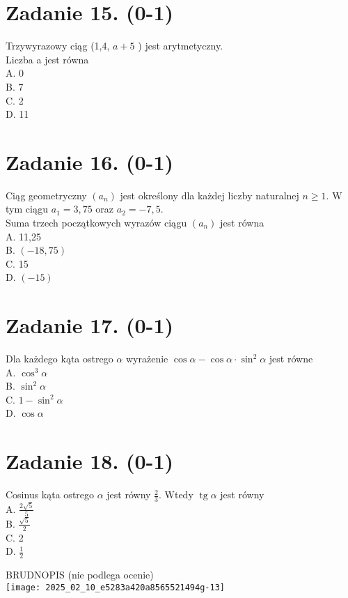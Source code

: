 \documentclass[10pt]{article}
\begin{document}
\section*{Zadanie 15. (0-1)}
Trzywyrazowy ciąg (1,4, \(a+5\) ) jest arytmetyczny.\\
Liczba a jest równa\\
A. 0\\
B. 7\\
C. 2\\
D. 11

\section*{Zadanie 16. (0-1)}
Ciąg geometryczny \(\left(a_{n}\right)\) jest określony dla każdej liczby naturalnej \(n \geq 1\). W tym ciągu \(a_{1}=3,75\) oraz \(a_{2}=-7,5\).\\
Suma trzech początkowych wyrazów ciągu \(\left(a_{n}\right)\) jest równa\\
A. 11,25\\
B. \((-18,75)\)\\
C. 15\\
D. \((-15)\)

\section*{Zadanie 17. (0-1)}
Dla każdego kąta ostrego \(\alpha\) wyrażenie \(\cos \alpha-\cos \alpha \cdot \sin ^{2} \alpha\) jest równe\\
A. \(\cos ^{3} \alpha\)\\
B. \(\sin ^{2} \alpha\)\\
C. \(1-\sin ^{2} \alpha\)\\
D. \(\cos \alpha\)

\section*{Zadanie 18. (0-1)}
Cosinus kąta ostrego \(\alpha\) jest równy \(\frac{2}{3}\). Wtedy \(\operatorname{tg} \alpha\) jest równy\\
A. \(\frac{2 \sqrt{5}}{5}\)\\
B. \(\frac{\sqrt{5}}{2}\)\\
C. 2\\
D. \(\frac{1}{2}\)

BRUDNOPIS (nie podlega ocenie)\\
\texttt{[image: 2025\_02\_10\_e5283a420a8565521494g-13]}
\end{document}
